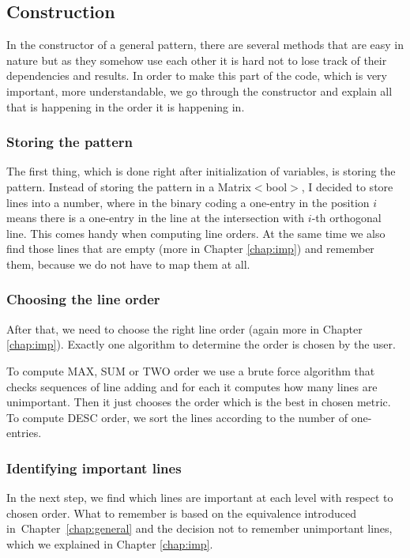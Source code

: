 \subsection{Construction}
In the constructor of a general pattern, there are several methods that are easy in nature but as they somehow use each other it is hard not to lose track of their dependencies and results. In order to make this part of the code, which is very important, more understandable, we go through the constructor and explain all that is happening in the order it is happening in.

\subsubsection{Storing the pattern}
The first thing, which is done right after initialization of variables, is storing the pattern. Instead of storing the pattern in a Matrix$<$bool$>$, I decided to store lines into a number, where in the binary coding a one-entry in the position $i$ means there is a one-entry in the line at the intersection with $i$-th orthogonal line. This comes handy when computing line orders. At the same time we also find those lines that are empty (more in Chapter \ref{chap:imp}) and remember them, because we do not have to map them at all.

\subsubsection{Choosing the line order}
After that, we need to choose the right line order (again more in Chapter \ref{chap:imp}). Exactly one algorithm to determine the order is chosen by the user.

To compute MAX, SUM or TWO order we use a brute force algorithm that checks sequences of line adding and for each it computes how many lines are unimportant. Then it just chooses the order which is the best in chosen metric. To compute DESC order, we sort the lines according to the number of one-entries.

\subsubsection{Identifying important lines}
In the next step, we find which lines are important at each level with respect to chosen order. What to remember is based on the equivalence introduced in~Chapter~\ref{chap:general} and the decision not to remember unimportant lines, which we explained in Chapter \ref{chap:imp}.

